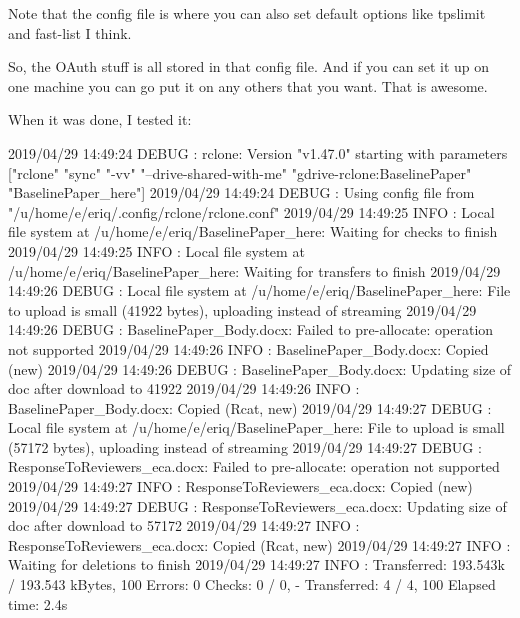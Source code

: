 \documentclass[]{krantz}
\makeatletter
\newenvironment{Shaded}{\begin{snugshade}}{\end{snugshade}}
\newcommand{\ExtensionTok}[1]{#1}
\newcommand{\NormalTok}[1]{#1}
\newcommand{\StringTok}[1]{\textcolor[rgb]{0.5,0.5,0.5}{#1}}
\newenvironment{kframe}{%
\medskip{}
\setlength{\fboxsep}{.8em}
 \def\at@end@of@kframe{}%
 \ifinner\ifhmode%
  \def\at@end@of@kframe{\end{minipage}}%
  \begin{minipage}{\columnwidth}%
 \fi\fi%
 \def\FrameCommand##1{\hskip\@totalleftmargin \hskip-\fboxsep
 \colorbox{shadecolor}{##1}\hskip-\fboxsep
     \hskip-\linewidth \hskip-\@totalleftmargin \hskip\columnwidth}%
 \MakeFramed {\advance\hsize-\width
   \@totalleftmargin\z@ \linewidth\hsize
   \@setminipage}}%
 {\par\unskip\endMakeFramed%
 \at@end@of@kframe}
\renewenvironment{Shaded}{\begin{kframe}}{\end{kframe}}
\makeatother
\begin{document}
Note that the config file is where you can also set default options like tpslimit and fast-list I think.

So, the OAuth stuff is all stored in that config file. And if you can set it up on one machine you can
go put it on any others that you want. That is awesome.

When it was done, I tested it:

\begin{Shaded}
\begin{Highlighting}[]
\ExtensionTok{%
\ExtensionTok{2019/04/29}\NormalTok{ 14:49:24 DEBUG : rclone: Version }\StringTok{"v1.47.0"}\NormalTok{ starting with parameters [}\StringTok{"rclone"} \StringTok{"sync"} \StringTok{"-vv"} \StringTok{"--drive-shared-with-me"} \StringTok{"gdrive-rclone:BaselinePaper"} \StringTok{"BaselinePaper_here"}\NormalTok{]}
\ExtensionTok{2019/04/29}\NormalTok{ 14:49:24 DEBUG : Using config file from }\StringTok{"/u/home/e/eriq/.config/rclone/rclone.conf"}
\ExtensionTok{2019/04/29}\NormalTok{ 14:49:25 INFO  : Local file system at /u/home/e/eriq/BaselinePaper_here: Waiting for checks to finish}
\ExtensionTok{2019/04/29}\NormalTok{ 14:49:25 INFO  : Local file system at /u/home/e/eriq/BaselinePaper_here: Waiting for transfers to finish}
\ExtensionTok{2019/04/29}\NormalTok{ 14:49:26 DEBUG : Local file system at /u/home/e/eriq/BaselinePaper_here: File to upload is small (41922 bytes), }\ExtensionTok{uploading}\NormalTok{ instead of streaming}
\ExtensionTok{2019/04/29}\NormalTok{ 14:49:26 DEBUG : BaselinePaper_Body.docx: Failed to pre-allocate: operation not supported}
\ExtensionTok{2019/04/29}\NormalTok{ 14:49:26 INFO  : BaselinePaper_Body.docx: Copied (new)}
\ExtensionTok{2019/04/29}\NormalTok{ 14:49:26 DEBUG : BaselinePaper_Body.docx: Updating size of doc after download to 41922}
\ExtensionTok{2019/04/29}\NormalTok{ 14:49:26 INFO  : BaselinePaper_Body.docx: Copied (Rcat, new)}
\ExtensionTok{2019/04/29}\NormalTok{ 14:49:27 DEBUG : Local file system at /u/home/e/eriq/BaselinePaper_here: File to upload is small (57172 bytes), }\ExtensionTok{uploading}\NormalTok{ instead of streaming}
\ExtensionTok{2019/04/29}\NormalTok{ 14:49:27 DEBUG : ResponseToReviewers_eca.docx: Failed to pre-allocate: operation not supported}
\ExtensionTok{2019/04/29}\NormalTok{ 14:49:27 INFO  : ResponseToReviewers_eca.docx: Copied (new)}
\ExtensionTok{2019/04/29}\NormalTok{ 14:49:27 DEBUG : ResponseToReviewers_eca.docx: Updating size of doc after download to 57172}
\ExtensionTok{2019/04/29}\NormalTok{ 14:49:27 INFO  : ResponseToReviewers_eca.docx: Copied (Rcat, new)}
\ExtensionTok{2019/04/29}\NormalTok{ 14:49:27 INFO  : Waiting for deletions to finish}
\ExtensionTok{2019/04/29}\NormalTok{ 14:49:27 INFO  : }
\ExtensionTok{Transferred}\NormalTok{:      193.543k / 193.543 kBytes, 100%
\ExtensionTok{Errors}\NormalTok{:                 0}
\ExtensionTok{Checks}\NormalTok{:                 0 / 0, -}
\ExtensionTok{Transferred}\NormalTok{:            4 / 4, 100%
\ExtensionTok{Elapsed}\NormalTok{ time:        2.4s}

}}}
\end{Highlighting}
\end{Shaded}
\end{document}
